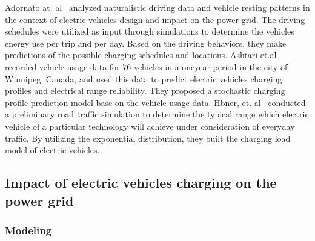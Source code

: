 Adornato at. al~\cite{YC_Adornato10} analyzed naturalistic driving data and vehicle resting patterns in the context of electric vehicles design and impact on the power grid. The driving schedules were utilized as input through simulations to determine the vehicles energy use per trip and per day. Based on the driving behaviors, they make predictions of the possible charging schedules and locations.
Ashtari et.al~\cite{YC_Ashtari11} recorded vehicle usage data for 76 vehicles in a one{\textendash}year period in the city of Winnipeg, Canada, and used this data to predict electric vehicles charging profiles and electrical range reliability. They proposed a stochastic charging profile prediction model base on the vehicle usage data.
Hbner, et. al~\cite{YC_Zhao12} conducted a preliminary road traffic simulation to determine the typical range which electric vehicle of a particular technology will achieve under consideration of everyday traffic. By utilizing the exponential distribution, they built the charging load model of electric vehicles.

\subsection{Impact of electric vehicles charging on the power grid}

\subsubsection{Modeling}
 
